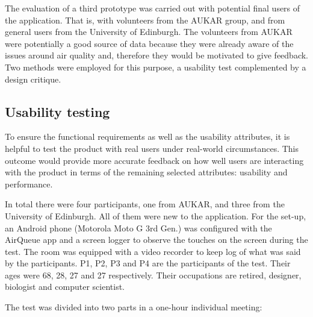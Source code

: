 The evaluation of a third prototype was carried out with potential final users of the application. That is, with volunteers from the AUKAR group, and from general users from the University of Edinburgh. The volunteers from AUKAR were potentially a good source of data because they were already aware of the issues around air quality and, therefore they would be motivated to give feedback. 
Two methods were employed for this purpose, a usability test complemented by a design critique. 

\subsection{Usability testing}
To ensure the functional requirements as well as the usability attributes, it is helpful to test the product with real users under real-world circumstances. This outcome would provide more accurate feedback on how well users are interacting with the product in terms of the remaining selected attributes: usability and performance.

In total there were four participants, one from AUKAR, and three from the University of Edinburgh. All of them were new to the application. For the set-up, an Android phone (Motorola Moto G 3rd Gen.) was configured with the AirQueue app and a screen logger to observe the touches on the screen during the test. The room was equipped with a video recorder to keep log of what was said by the participants. P1, P2, P3 and P4 are the participants of the test. Their ages were 68, 28, 27 and 27 respectively. Their occupations are retired, designer, biologist and computer scientist. 

The test was divided into two parts in a one-hour individual meeting:

